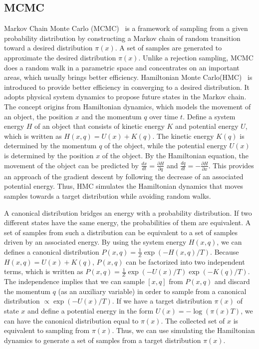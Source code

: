 \documentclass[letterpaper, 10 pt, conference]{ieeeconf}  %
\begin{document}
\subsection{MCMC}
\label{subsec:mcmc}
Markov Chain Monte Carlo (MCMC)~\cite{ADDJ03} is a framework of sampling from a given probability distribution by constructing a Markov chain of random transition toward a desired distribution $ \pi (x) $.
A set of samples are generated to approximate the desired distribution $ \pi (x) $.
Unlike a rejection sampling, MCMC does a random walk in a parametric space and concentrates on an important areas, which usually brings better efficiency.
Hamiltonian Monte Carlo(HMC)~\cite{N11} is introduced to provide better efficiency in converging to a desired distribution.
It adopts physical system dynamics to propose future states in the Markov chain.
The concept origins from Hamiltonian dynamics, which models the movement of an object, the position $ x $ and the momentum $ q $ over time $ t $.
Define a system energy $ H $ of an object that consists of kinetic energy $ K $ and potential energy $ U $, which is written as $ H(x,q) = U(x) + K(q) $.
The kinetic energy $ K(q) $ is determined by the momentum $ q $ of the object, while the potential energy $ U(x) $ is determined by the position $ x $ of the object.
By the Hamiltonian equation, the movement of the object can be predicted by
$ \frac{dx}{dt} = \frac{\partial H}{\partial q} $ and $ \frac{dq}{dt} = - \frac{\partial H}{\partial x} $.
This provides an approach of the gradient descent by following the decrease of an associated potential energy.
Thus, HMC simulates the Hamiltonian dynamics that moves samples towards a target distribution while avoiding random walks.

A canonical distribution bridges an energy with a probability distribution.
If two different states have the same energy, the probabilities of them are equivalent.
A set of samples from such a distribution can be equivalent to a set of samples driven by an associated energy.
By using the system energy $ H(x, q) $, we can defines a canonical distribution $ P(x, q) = \frac{1}{Z} \exp ( -H(x,q) / T ) $.
Because $ H(x,q) = U(x) + K(q) $, $ P(x, q) $ can be factorized into two independent terms, which is written as $ P(x, q) = \frac{1}{Z} \exp ( -U(x) / T) \exp (-K(q) / T) $.
The independence implies that we can sample $ [ x ,q ] $ from $ P(x, q) $ and discard the momentum $ q $ (as an auxiliary variable) in order to sample from a canonical distribution $ \propto \exp ( -U(x) / T) $.
If we have a target distribution $ \pi(x) $ of state $ x $ and define a potential energy in the form $  U(x) = - \log ( \pi(x) T ) $, we can have the canonical distribution equal to $ \pi(x) $.
The collected set of $ x $ is equivalent to sampling from $ \pi(x) $.
Thus, we can use simulating the Hamiltonian dynamics to generate a set of samples from a target distribution $ \pi (x) $.
\end{document}
